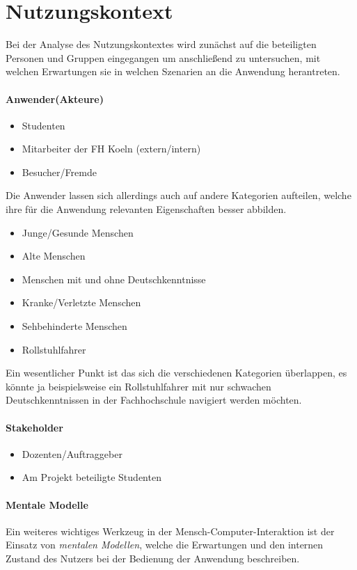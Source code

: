 \chapter{Nutzungskontext}
Bei der Analyse des Nutzungskontextes wird zunächst auf die beteiligten Personen und Gruppen eingegangen um anschließend zu untersuchen, mit welchen Erwartungen sie in welchen Szenarien an die Anwendung herantreten.

\subsubsection*{Anwender(Akteure)}
\begin{itemize}
  \item Studenten
  \item Mitarbeiter der FH Koeln (extern/intern)
  \item Besucher/Fremde
\end{itemize}

\noindent
Die Anwender lassen sich allerdings auch auf andere Kategorien aufteilen, welche ihre für die Anwendung relevanten Eigenschaften besser abbilden.
\begin{itemize}
  \item Junge/Gesunde Menschen
  \item Alte Menschen
  \item Menschen mit und ohne Deutschkenntnisse
  \item Kranke/Verletzte Menschen
  \item Sehbehinderte Menschen
  \item Rollstuhlfahrer
\end{itemize}

\noindent
Ein wesentlicher Punkt ist das sich die verschiedenen Kategorien überlappen, es könnte ja beispielsweise ein Rollstuhlfahrer mit nur schwachen Deutschkenntnissen in der Fachhochschule navigiert werden möchten.

\subsubsection*{Stakeholder}
\begin{itemize}
  \item Dozenten/Auftraggeber
  \item Am Projekt beteiligte Studenten
\end{itemize}

\subsubsection*{Mentale Modelle}
Ein weiteres wichtiges Werkzeug in der Mensch-\-Computer-\-Interaktion ist der Einsatz von \emph{mentalen Modellen}, welche die Erwartungen und den internen Zustand des Nutzers bei der Bedienung der Anwendung beschreiben. \medskip

